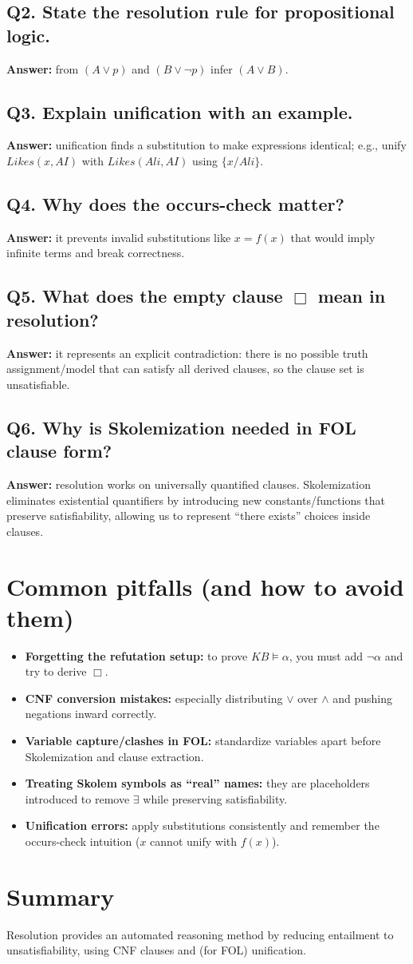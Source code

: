 \documentclass[11pt]{article}
\begin{document}
\subsection*{Q2. State the resolution rule for propositional logic.}
\textbf{Answer:} from $(A \lor p)$ and $(B \lor \lnot p)$ infer $(A \lor B)$.

\subsection*{Q3. Explain unification with an example.}
\textbf{Answer:} unification finds a substitution to make expressions identical; e.g., unify $Likes(x,AI)$ with $Likes(Ali,AI)$ using $\{x/Ali\}$.

\subsection*{Q4. Why does the occurs-check matter?}
\textbf{Answer:} it prevents invalid substitutions like $x=f(x)$ that would imply infinite terms and break correctness.

\subsection*{Q5. What does the empty clause $\Box$ mean in resolution?}
\textbf{Answer:} it represents an explicit contradiction: there is no possible truth assignment/model that can satisfy all derived clauses, so the clause set is unsatisfiable.

\subsection*{Q6. Why is Skolemization needed in FOL clause form?}
\textbf{Answer:} resolution works on universally quantified clauses. Skolemization eliminates existential quantifiers by introducing new constants/functions that preserve satisfiability, allowing us to represent ``there exists'' choices inside clauses.

\section{Common pitfalls (and how to avoid them)}
\begin{itemize}[leftmargin=*]
  \item \textbf{Forgetting the refutation setup:} to prove $KB\models \alpha$, you must add $\lnot\alpha$ and try to derive $\Box$.
  \item \textbf{CNF conversion mistakes:} especially distributing $\lor$ over $\land$ and pushing negations inward correctly.
  \item \textbf{Variable capture/clashes in FOL:} standardize variables apart before Skolemization and clause extraction.
  \item \textbf{Treating Skolem symbols as ``real'' names:} they are placeholders introduced to remove $\exists$ while preserving satisfiability.
  \item \textbf{Unification errors:} apply substitutions consistently and remember the occurs-check intuition ($x$ cannot unify with $f(x)$).
\end{itemize}

\section{Summary}
Resolution provides an automated reasoning method by reducing entailment to unsatisfiability, using CNF clauses and (for FOL) unification.
\notesources{\AIMLUnitIISources}
\end{document}
